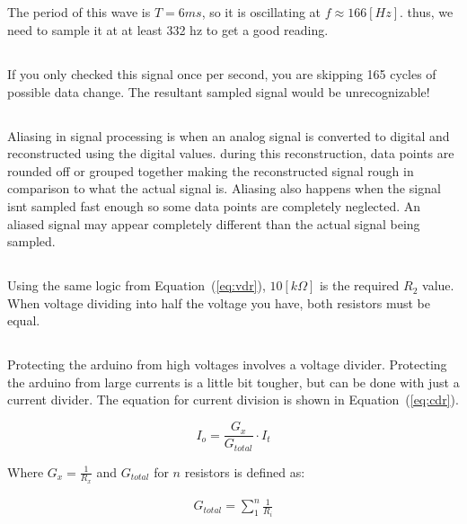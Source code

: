 \documentclass{hw}
\begin{document}
\subsection{}The period of this wave is $T=6 ms$, so it is oscillating
at $f\approx 166 [Hz]$. thus, we need to sample it at at least 332 hz to get a
good reading.

\subsection{} If you only checked this signal once per second, you
are skipping 165 cycles of possible data change. The resultant
sampled signal would be unrecognizable!

\subsection{} Aliasing in signal processing is when an analog signal
is converted to digital and reconstructed using the digital values.
during this reconstruction, data points are rounded off or grouped
together making the reconstructed signal rough in comparison to what
the actual signal is. Aliasing also happens when the signal isnt
sampled fast enough so some data points are completely neglected. An
aliased signal may appear completely different than the actual
signal being sampled.

\subsection{}Using the same logic from Equation~(\ref{eq:vdr}),
$10[k\Omega]$ is the required $R_2$ value. When voltage dividing
into half the voltage you have, both resistors must be equal.

\subsection{}Protecting the arduino from high voltages involves a
voltage divider. Protecting the arduino from large currents is a
little bit tougher, but can be done with just a current divider. The
equation for current division is shown in Equation~(\ref{eq:cdr}).

\begin{equation}
  I_o = \frac{G_x}{G_{total}}\cdot I_t
  \label{eq:cdr}
\end{equation}

Where $G_x=\frac{1}{R_x}$ and $G_{total}$ for $n$ resistors is
defined as:

\begin{align*}
  G_{total} = \sum_1^n \frac{1}{R_i}
\end{align*}
\end{document}
